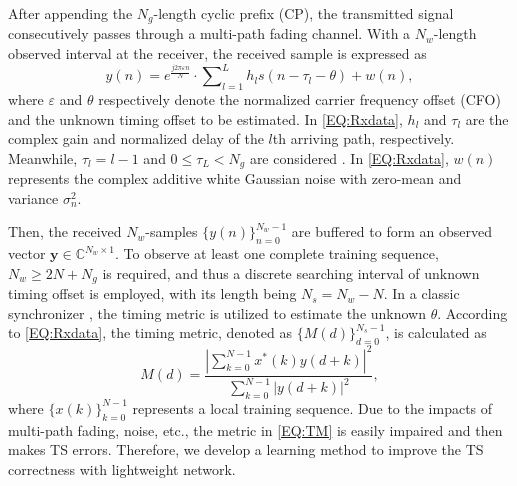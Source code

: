 \documentclass[conference]{IEEEtran}
\begin{document}
After appending the $N_g$-length cyclic prefix (CP), the transmitted signal consecutively passes through a multi-path fading channel.
With a $N_w$-length observed interval at the receiver, the received sample is expressed as
\begin{equation}\label{EQ:Rxdata}
y\left( n \right) = {{e^{\frac{{{j2\pi\varepsilon}n}}{N}}}\cdot\sum\nolimits_{l = 1}^L {h_l}{s\left( {n - {\tau _l}- \theta } \right)}}  + w\left( {n} \right),
\end{equation}
where $\varepsilon$ and $\theta$ respectively denote the normalized carrier frequency offset (CFO) and the unknown timing offset to be estimated. In \eqref{EQ:Rxdata}, $h_l$ and $\tau_l$ are the complex gain and normalized delay of the $l$th arriving path, respectively.
Meanwhile, $\tau_l=l-1$ and $0\le\tau_L<N_g$ are considered \cite{ref:Ch1}.
In \eqref{EQ:Rxdata}, $w(n)$ represents the complex additive white Gaussian noise with zero-mean and variance $\sigma_n^2$.

Then, the received $N_w$-samples $\{y\left( n \right)\}^{N_w-1}_{n=0}$ are buffered to form an observed vector $\mathbf{y}\in\mathbb{C}^{N_w\times1}$.
To observe at least one complete training sequence, $N_w\ge2N+N_g$ is required, and thus a discrete searching interval of unknown timing offset is employed, with its length being $N_s=N_w-N$.
In a classic synchronizer \cite{ref:CC}, the timing metric is utilized to estimate the unknown $\theta$. According to \eqref{EQ:Rxdata}, the timing metric, denoted as $\{M(d)\}^{N_s-1}_{d=0}$, is calculated as\cite{ref:CC}
\begin{equation}\label{EQ:TM}
M\left( d \right) = \frac{\left|\sum\nolimits_{k = 0}^{N - 1} {x^ *(k)}{y \left( {d + k} \right)}\right|^2}{\sum\nolimits_{k = 0}^{N - 1} \left|{y \left( {d + k} \right)}\right|^2},
\end{equation}
where $\{x(k)\}^{N-1}_{k=0}$ represents a local training sequence. Due to the impacts of multi-path fading, noise, etc., the metric in \eqref{EQ:TM} is easily impaired and then makes TS errors. Therefore, we develop a learning method to improve the TS correctness with lightweight network.
\vspace{-2mm}
\end{document}
